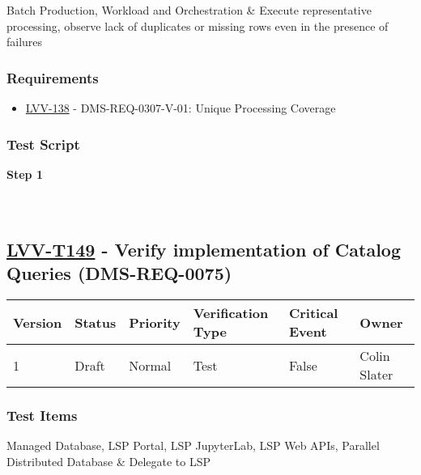 Batch Production, Workload and Orchestration \& Execute representative
processing, observe lack of duplicates or missing rows even in the
presence of failures

\hypertarget{requirements-48}{%
\subsubsection{Requirements}\label{requirements-48}}

\begin{itemize}
\tightlist
\item
  \href{https://jira.lsstcorp.org/browse/LVV-138}{LVV-138} -
  DMS-REQ-0307-V-01: Unique Processing Coverage
\end{itemize}

\hypertarget{test-script-48}{%
\subsubsection{Test Script}\label{test-script-48}}

\textbf{Step 1}\\
~\\
~\\

\hypertarget{lvv-t149---verify-implementation-of-catalog-queries-dms-req-0075}{%
\subsection{\texorpdfstring{\href{https://jira.lsstcorp.org/secure/Tests.jspa\#/testCase/LVV-T149}{LVV-T149}
- Verify implementation of Catalog Queries
(DMS-REQ-0075)}{LVV-T149 - Verify implementation of Catalog Queries (DMS-REQ-0075)}}\label{lvv-t149---verify-implementation-of-catalog-queries-dms-req-0075}}

\begin{longtable}[]{@{}llllll@{}}
\toprule
Version & Status & Priority & Verification Type & Critical Event &
Owner\tabularnewline
\midrule
\endhead
1 & Draft & Normal & Test & False & Colin Slater\tabularnewline
\bottomrule
\end{longtable}

\hypertarget{test-items-49}{%
\subsubsection{Test Items}\label{test-items-49}}

Managed Database, LSP Portal, LSP JupyterLab, LSP Web APIs, Parallel
Distributed Database \& Delegate to LSP

